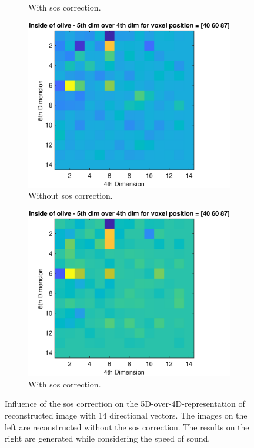 \begin{figure}[H]
\begin{subfigure}[b]{0.47\textwidth}
         \caption{With \ac{sos} correction.}
         \label{fig:influence_sos_2_b}
     \end{subfigure}
          \hfill
     \begin{subfigure}[b]{0.47\textwidth}
         \centering
         \includegraphics[width=1.02\textwidth]{Graphics/Results/14_vecs_sos_vs_noSos/5thdim_over4D_no_sos_inside_olive.eps}
         \caption{Without \ac{sos} correction.}
         \label{leer}
     \end{subfigure}
          \hfill
     \begin{subfigure}[b]{0.47\textwidth}
         \centering
         \includegraphics[width=1.02\textwidth]{Graphics/Results/14_vecs_sos_vs_noSos/5thdim_over4D_with_sos_inside_olive.eps}
         \caption{With \ac{sos} correction.}
         \label{leer}
     \end{subfigure}
        \caption{Influence of the \ac{sos} correction on the 5D-over-4D-representation of reconstructed image with 14 directional vectors. The images on the left are reconstructed without the \ac{sos} correction. The results on the right are generated while considering the speed of sound.}
        \label{fig:influence_sos_2}
\end{figure}


